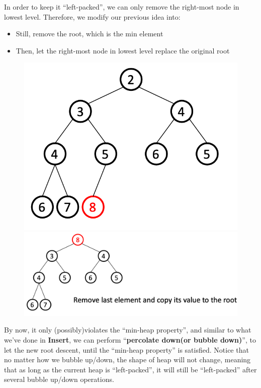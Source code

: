 \begin{spacing}{1.3}
    In order to keep it ``left-packed'', we can only remove the right-most node 
    in lowest level. Therefore, we modify our previous idea into:
    \begin{itemize}
        \item Still, remove the root, which is the min element
        \item Then, let the right-most node in lowest level replace the original root
    \end{itemize}
    \begin{figure}[htbp]
        \centering
        \includegraphics[scale=0.3]{images/05-min-1.png}\qquad 
        \includegraphics[scale=0.3]{images/05-min-2.png}
    \end{figure}

    By now, it only (possibly)violates the ``min-heap property'', and similar to what we've done 
    in {\bf Insert}, we can perform ``{\bf percolate down(or bubble down)}'', to 
    let the new root descent, until the ``min-heap property'' is satisfied.
    Notice that no matter how we bubble up/down, the shape of heap will not change,
    meaning that as long as the current heap is ``left-packed'', it will 
    still be ``left-packed'' after several bubble up/down operations.


\end{spacing}
